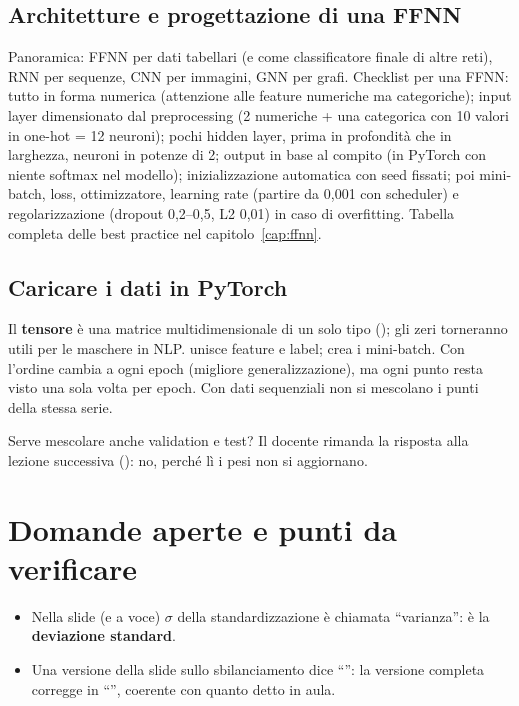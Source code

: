 \subsection{Architetture e progettazione di una FFNN}
Panoramica: FFNN per dati tabellari (e come classificatore finale di altre reti), RNN per sequenze,
CNN per immagini, GNN per grafi. Checklist per una FFNN: tutto in forma numerica (attenzione alle
feature numeriche ma categoriche); input layer dimensionato dal preprocessing (2 numeriche + una
categorica con 10 valori in one-hot = 12 neuroni); pochi hidden layer, prima in profondità che in
larghezza, neuroni in potenze di 2; output in base al compito (in PyTorch con
 niente softmax nel modello); inizializzazione automatica con seed fissati;
poi mini-batch, loss, ottimizzatore, learning rate (partire da 0,001 con scheduler) e
regolarizzazione (dropout 0,2--0,5, L2 0,01) in caso di overfitting. Tabella completa delle best
practice nel capitolo~\ref{cap:ffnn}.

\subsection{Caricare i dati in PyTorch}
Il \textbf{tensore} è una matrice multidimensionale di un solo tipo (); gli zeri
torneranno utili per le maschere in NLP.  unisce feature e label;
 crea i mini-batch. Con  l'ordine
cambia a ogni epoch (migliore generalizzazione), ma ogni punto resta visto una sola volta per epoch.
Con dati sequenziali non si mescolano i punti della stessa serie.

\begin{nota}
Serve mescolare anche validation e test? Il docente rimanda la risposta alla lezione successiva
(): no, perché lì i pesi non si aggiornano.
\end{nota}

\section{Domande aperte e punti da verificare}
\begin{verifica}
\begin{itemize}
  \item Nella slide (e a voce) $\sigma$ della standardizzazione è chiamata ``varianza'': è la
    \textbf{deviazione standard}.
  \item Una versione della slide sullo sbilanciamento dice ``'': la
    versione completa corregge in ``'', coerente con quanto detto in
    aula.
\end{itemize}
\end{verifica}
